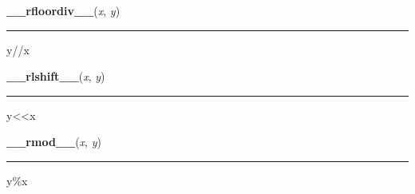     \label{numpy:ndarray:__rfloordiv__}

    \vspace{0.5ex}

    \begin{boxedminipage}{\textwidth}

    \raggedright \textbf{\_\_rfloordiv\_\_}(\textit{x}, \textit{y})

    \vspace{-1.5ex}

    \rule{\textwidth}{0.5\fboxrule}

y//x
    \vspace{1ex}

    \end{boxedminipage}

    \label{numpy:ndarray:__rlshift__}

    \vspace{0.5ex}

    \begin{boxedminipage}{\textwidth}

    \raggedright \textbf{\_\_rlshift\_\_}(\textit{x}, \textit{y})

    \vspace{-1.5ex}

    \rule{\textwidth}{0.5\fboxrule}

y{\textless}{\textless}x
    \vspace{1ex}

    \end{boxedminipage}

    \label{numpy:ndarray:__rmod__}

    \vspace{0.5ex}

    \begin{boxedminipage}{\textwidth}

    \raggedright \textbf{\_\_rmod\_\_}(\textit{x}, \textit{y})

    \vspace{-1.5ex}

    \rule{\textwidth}{0.5\fboxrule}

y{\%}x
    \vspace{1ex}

    \end{boxedminipage}

    \label{numpy:ndarray:__rmul__}

